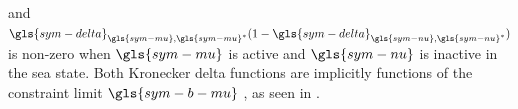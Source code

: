 \documentclass[a4paper,fleqn,colorlinks,unicode,lineno]{cas-dc} %
\begin{document}
and $\gls{sym-delta}_{\gls{sym-mu},\gls{sym-mu}^*}(1-\gls{sym-delta}_{\gls{sym-nu},\gls{sym-nu}^*})$  is non-zero when $\gls{sym-mu}$  is active and $\gls{sym-nu}$  is inactive in the sea state.
Both Kronecker delta functions are implicitly functions of the constraint limit $\gls{sym-b-mu}$ , as seen in .
\end{document}

